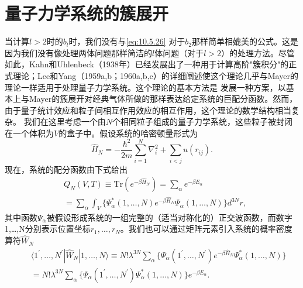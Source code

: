 \section{量子力学系统的簇展开}\label{ux91cfux5b50ux529bux5b66ux7cfbux7edfux7684ux7c07ux5c55ux5f00}
当计算\(l > 2\)时的\(b_{l}\)时，我们没有与\autoref{eq:10.5.26} 对于\(b_{2}\)那样简单相媲美的公式。这是因为我们没有像处理两体问题那样简洁的\(l\)体问题（对于\(l > 2\)）的处理方法。尽管如此，Kahn和Uhlenbeck（1938年）已经发展出了一种用于计算高阶"簇积分"的正式理论；Lee和Yang（1959a,b；1960a,b,c）的详细阐述使这个理论几乎与Mayer的理论一样适用于处理量子力学系统。这个理论的基本方法是
发展一种方案，以基本上与Mayer的簇展开对经典气体所做的那样表达给定系统的巨配分函数。然而，由于量子统计效应和粒子间相互作用效应的相互作用，这个理论的数学结构相当复杂。
我们在这里考虑一个由\(N\)个相同粒子组成的量子力学系统，这些粒子被封闭在一个体积为\(V\)的盒子中。假设系统的哈密顿量形式为
\begin{equation}\tag{10.6.1}\label{eq:10.6.1}
\hat { H } _ { N } = - \frac { \hbar ^{2} } { 2 m } \sum _ { i = 1 } ^{N} \nabla _ { i } ^{2} + \sum _ { i < j } u ( r _ { i j } ) .
\end{equation}
现在，系统的配分函数由下式给出
\begin{equation}\tag{10.6.2}\label{eq:10.6.2}
\begin{array}{rl} & { Q _ { N } ( V , T ) \equiv \mathrm { T r } ( e ^{- \beta \hat { H} _ { N } } ) = \sum _ { \alpha } e ^{- \beta E _ { \alpha} } } \\& {  = \sum _ { \alpha } \int _ { V } \{ \Psi _ { \alpha } ^{*} ( 1 , \ldots , N ) e ^{- \beta \hat { H} _ { N } } \Psi _ { \alpha } ( 1 , \ldots , N ) \} d ^{3 N} r , } \end{array}
\end{equation}
其中函数\(\Psi_{\alpha}\)被假设形成系统的一组完整的（适当对称化的）正交波函数，而数字1,\ldots,N分别表示位置坐标\(r_{1},\ldots,r_{N}\)。我们也可以通过矩阵元素引入系统的概率密度算符\(\hat{W}_{N}\)
\begin{equation}\tag{10.6.3}\label{eq:10.6.3}
\begin{array}{rlr} & { } & { \langle 1 ^{\prime} , \ldots , N ^{\prime} | \hat { W } _ { N } | 1 , \ldots , N \rangle \equiv N ! \lambda ^{3 N} \sum _ { \alpha } \{ \Psi _ { \alpha } ( 1 ^{\prime} , \ldots , N ^{\prime} ) e ^{- \beta \hat { H} _ { N } } \Psi _ { \alpha } ^{*} ( 1 , \ldots , N ) \} } \\& { } & { = N ! \lambda ^{3 N} \sum _ { \alpha } \{ \Psi _ { \alpha } ( 1 ^{\prime} , \ldots , N ^{\prime} ) \Psi _ { \alpha } ^{*} ( 1 , \ldots , N ) \} e ^{- \beta E _ { \alpha} } . } \end{array}
\end{equation}
